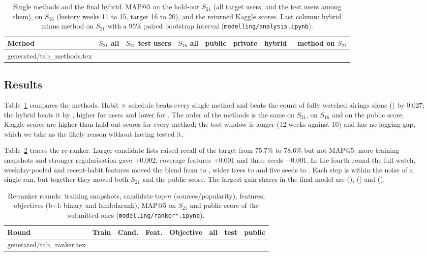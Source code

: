 \documentclass[conference]{IEEEtran}
\makeatletter
\newcommand{\tabinput}[1]{\@@input #1 }
\makeatother
\begin{document}
\begin{table}[t]
\centering
\caption{Single methods and the final hybrid. MAP@5 on the hold-out $S_{21}$ (all \nTargetWtwo{} target users, and the \nTestTargetWtwo{} test users among them), on $S_{16}$ (history weeks 11 to 15, target 16 to 20), and the returned Kaggle scores. Last column: hybrid minus method on $S_{21}$ with a 95\% paired bootstrap interval (\texttt{modelling/analysis.ipynb}).}
\label{tab:methods}
\begin{tabular}{lrrrrrr}
\toprule
Method & $S_{21}$ all & $S_{21}$ test users & $S_{16}$ all & public & private & hybrid $-$ method on $S_{21}$ \\
\midrule
\tabinput{generated/tab_methods.tex}
\bottomrule
\end{tabular}
\end{table}

\subsection{Results}
Table~\ref{tab:methods} compares the methods. Habit $\times$ schedule beats every single method and beats the count of fully watched airings alone (\mapHScount) by 0.027; the hybrid beats it by \diffHS{} \ciHS{}, higher for \higherHS{} users and lower for \lowerHS{}. The order of the methods is the same on $S_{21}$, on $S_{16}$ and on the public score. Kaggle scores are higher than hold-out scores for every method; the test window is longer (12 weeks against 10) and has no logging gap, which we take as the likely reason without having tested it.

Table~\ref{tab:ranker} traces the re-ranker. Larger candidate lists raised recall of the target from 75.7\% to 78.6\% but not MAP@5; more training snapshots and stronger regularisation gave +0.002, coverage features +0.001 and three seeds +0.001. In the fourth round the full-watch, weekday-pooled and recent-habit features moved the blend from \mapEfour{} to \mapEfive{}, wider trees to \mapEfiveWide{} and five seeds to \mapFinal{}. Each step is within the noise of a single run, but together they moved both $S_{21}$ and the public score. The largest gain shares in the final model are \impNameA{} (\impShareA), \impNameB{} (\impShareB) and \impNameC{} (\impShareC).

\begin{table}[t]
\centering
\caption{Re-ranker rounds: training snapshots, candidate top-$n$ (sources/popularity), features, objectives (b+l: binary and lambdarank), MAP@5 on $S_{21}$ and public score of the submitted ones (\texttt{modelling/ranker*.ipynb}).}
\label{tab:ranker}
\setlength{\tabcolsep}{2.2pt}
\footnotesize
\begin{tabular}{lllllrrr}
\toprule
Round & Train & Cand. & Feat. & Objective & all & test & public \\
\midrule
\tabinput{generated/tab_ranker.tex}
\bottomrule
\end{tabular}
\end{table}
\end{document}
